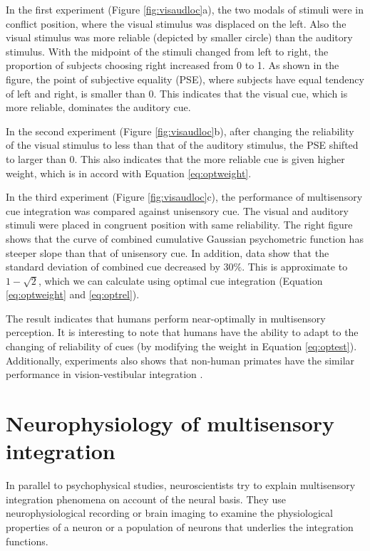 \documentclass{article}[11pt]
\begin{document}
In the first experiment (Figure \ref{fig:visaudloc}a), the two modals of stimuli were in conflict position, where the visual stimulus was displaced on the left. Also the visual stimulus was more reliable (depicted by smaller circle) than the auditory stimulus. With the midpoint of the stimuli changed from left to right, the proportion of subjects choosing right increased from 0 to 1. As shown in the figure, the point of subjective equality (PSE), where subjects have equal tendency of left and right, is smaller than 0. This indicates that the visual cue, which is more reliable, dominates the auditory cue.

In the second experiment (Figure \ref{fig:visaudloc}b), after changing the reliability of the visual stimulus to less than that of the auditory stimulus, the PSE shifted to larger than 0. This also indicates that the more reliable cue is given higher weight, which is in accord with Equation \ref{eq:optweight}.

In the third experiment (Figure \ref{fig:visaudloc}c), the performance of multisensory cue integration was compared against unisensory cue. The visual and auditory stimuli were placed in congruent position with same reliability. The right figure shows that the curve of combined cumulative Gaussian psychometric function has steeper slope than that of unisensory cue. In addition, data show that the standard deviation of combined cue decreased by $30\%$. This is approximate to $1-\sqrt{2}$, which we can calculate using optimal cue integration (Equation \ref{eq:optweight} and \ref{eq:optrel}).

The result indicates that humans perform near-optimally in multisensory perception. It is interesting to note that humans have the ability to adapt to the changing of reliability of cues (by modifying the weight in Equation \ref{eq:optest}). Additionally, experiments also shows that non-human primates have the similar performance in vision-vestibular integration \cite{gu_neural_2008}.

\section{Neurophysiology of multisensory integration}
In parallel to psychophysical studies, neuroscientists try to explain multisensory integration phenomena on account of the neural basis.
They use neurophysiological recording or brain imaging to examine the physiological properties of a neuron or a population of neurons that underlies the integration functions.
\end{document}
